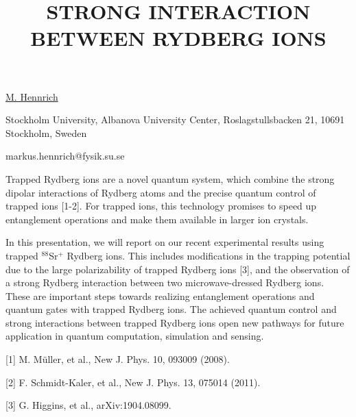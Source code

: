 \title{STRONG INTERACTION BETWEEN RYDBERG IONS}

\underline{M. Hennrich}  

{\normalsize{\vspace{-4mm}
Stockholm University,
Albanova University Center,
Roslagstullsbacken 21,
10691 Stockholm,
Sweden



\email markus.hennrich@fysik.su.se}}

Trapped Rydberg ions are a novel quantum system, which combine the strong dipolar interactions of Rydberg atoms and the precise quantum control of trapped ions [1-2]. For trapped ions, this technology promises to speed up entanglement operations and make them available in larger ion crystals.

In this presentation, we will report on our recent experimental results using trapped $^{88}$Sr$^+$ Rydberg ions.  This includes modifications in the trapping potential due to the large polarizability of trapped Rydberg ions [3], and the observation of a strong Rydberg interaction between two microwave-dressed Rydberg ions. These are important steps towards realizing entanglement operations and quantum gates with trapped Rydberg ions.
The achieved quantum control and strong interactions between trapped Rydberg ions open new pathways for future application in quantum computation, simulation and sensing.      

{\normalsize
[1] M. M\"uller, et al., New J. Phys. 10, 093009 (2008).
\vsp

[2] F. Schmidt-Kaler, et al., New J. Phys. 13, 075014 (2011).
\vsp

[3] G. Higgins, et al., arXiv:1904.08099.
}

\vspace{\baselineskip}
